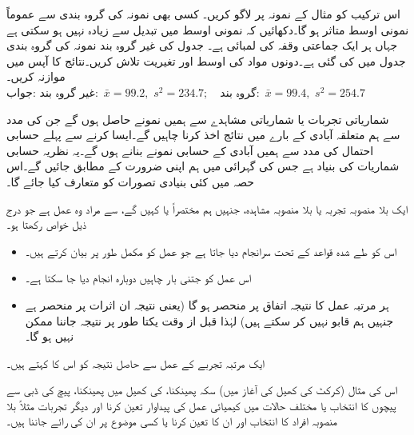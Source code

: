 \quad
اس ترکیب کو مثال  کے نمونہ پر لاگو کریں۔
\quad
کسی بھی نمونہ کی گروہ بندی سے عموماً نمونی اوسط متاثر ہو گا۔دکھائیں کہ نمونی اوسط میں تبدیل  سے زیادہ نہیں ہو سکتی ہے جہاں ہر ایک جماعتی وقفہ کی لمبائی  ہے۔
\quad
جدول  کی غیر گروہ بند نمونہ کی گروہ بندی  جدول  میں کی گئی ہے۔دونوں مواد کی اوسط اور تغیریت تلاش کریں۔نتائج کا آپس میں موازنہ کریں۔\\
جواب:\quad
$\text{غیر گروہ بند}:\,\, \bar{x}=99.2,\,\, s^2=234.7;\quad \text{گروہ بند}:\,\, \bar{x}=99.4,\,\, s^2=254.7$

شماریاتی تجربات یا شماریاتی مشاہدے  سے ہمیں نمونے حاصل ہوں گے جن کی مدد سے ہم متعلقہ  آبادی کے بارے میں نتائج اخذ کرنا چاہیں گے۔ایسا کرنے سے پہلے  حسابی احتمال کی مدد سے ہمیں آبادی کے حسابی نمونے  بنانے ہوں گے۔یہ نظریہ حسابی شماریات کی بنیاد ہے جس کی گہرائی میں ہم اپنی ضرورت کے مطابق  جائیں گے۔اس حصہ میں کئی بنیادی تصورات کو متعارف کیا جائے گا۔

ایک بلا منصوبہ تجربہ یا بلا منصوبہ  مشاہدہ، جنہیں ہم مختصراً  یا  کہیں گے، سے مراد وہ عمل ہے جو درج ذیل خواص رکھتا ہو۔
\begin{itemize}
\item
اس کو طے شدہ قواعد کے تحت سرانجام دیا جاتا ہے جو عمل کو مکمل طور پر بیان کرتے ہیں۔
\item
اس  عمل کو جتنی بار چاہیں دوبارہ انجام  دیا جا سکتا ہے۔
\item
ہر مرتبہ عمل کا نتیجہ  اتفاق پر منحصر ہو گا (یعنی نتیجہ ان اثرات پر منحصر ہے جنہیں ہم قابو نہیں کر سکتے ہیں) لہٰذا قبل از وقت  یکتا طور پر نتیجہ جاننا ممکن نہیں ہو گا۔
\end{itemize} 

ایک مرتبہ تجربے کے عمل سے حاصل نتیجہ کو  اس  کا   کہتے ہیں۔

اس کی مثال (کرکٹ کی کھیل کی آغاز میں) سکہ پھینکنا،  کی کھیل میں  پھینکنا،  پیچ کی ڈبی سے  پیچوں کا انتخاب  یا مختلف حالات میں کیمیائی عمل کی  پیداوار تعین کرنا اور دیگر تجربات مثلاً  بلا منصوبہ  افراد کا انتخاب اور ان کا  تعین کرنا یا کسی موضوع پر ان کی رائے جاننا ہیں۔

